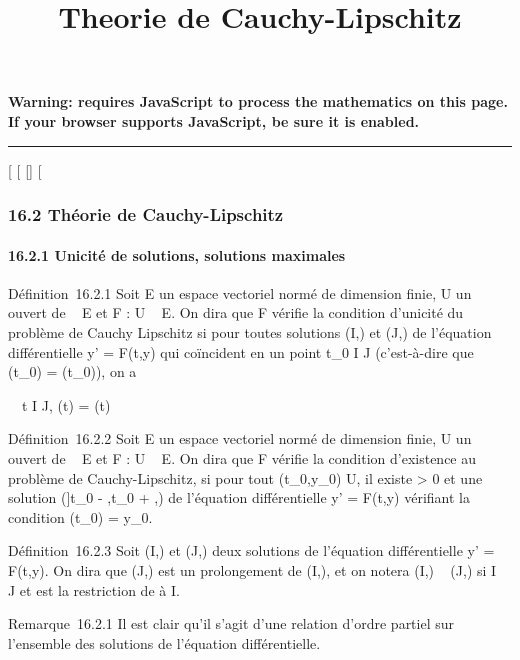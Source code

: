 \documentclass[]{article}
\title{Theorie de Cauchy-Lipschitz}
\author{}
\date{}
\begin{document}
\maketitle

\textbf{Warning: 
requires JavaScript to process the mathematics on this page.\\ If your
browser supports JavaScript, be sure it is enabled.}

\begin{center}\rule{3in}{0.4pt}\end{center}

{[}
{[}
{[}{]}
{[}

\subsubsection{16.2 Théorie de Cauchy-Lipschitz}

\paragraph{16.2.1 Unicité de solutions, solutions maximales}

Définition~16.2.1 Soit E un espace vectoriel normé de dimension finie, U
un ouvert de ~ \times E et F : U \rightarrow~ E. On dira que F vérifie la condition
d'unicité du problème de Cauchy Lipschitz si pour toutes solutions (I,\phi)
et (J,\psi) de l'équation différentielle y' = F(t,y) qui coïncident en un
point t\_0 \in I \bigcap J (c'est-à-dire que \phi(t\_0) =
\psi(t\_0)), on a

\forall~~t \in I \bigcap J, \phi(t) = \psi(t)

Définition~16.2.2 Soit E un espace vectoriel normé de dimension finie, U
un ouvert de ~ \times E et F : U \rightarrow~ E. On dira que F vérifie la condition
d'existence au problème de Cauchy-Lipschitz, si pour tout
(t\_0,y\_0) \in U, il existe \eta \textgreater{} 0 et une
solution ({]}t\_0 - \eta,t\_0 + \eta{[},\phi) de l'équation
différentielle y' = F(t,y) vérifiant la condition \phi(t\_0) =
y\_0.

Définition~16.2.3 Soit (I,\phi) et (J,\psi) deux solutions de l'équation
différentielle y' = F(t,y). On dira que (J,\psi) est un prolongement de
(I,\phi), et on notera (I,\phi) \prec~ (J,\psi) si I \subset~ J et \phi est la restriction de \psi
à I.

Remarque~16.2.1 Il est clair qu'il s'agit d'une relation d'ordre partiel
sur l'ensemble des solutions de l'équation différentielle.
\end{document}
